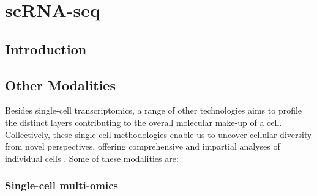 
\newpage

\section{scRNA-seq}  %
\label{sec:scrna} 

\subsection{Introduction}
\label{sec:141}


\subsection{Other Modalities}
\label{sec:142}

Besides single-cell transcriptomics, a range of other technologies aims to profile the distinct layers contributing to the overall molecular make-up of a cell. Collectively, these single-cell methodologies enable us to uncover cellular diversity from novel perspectives, offering comprehensive and impartial analyses of individual cells \textbf{\cite{stein_single-cell_2021}}. Some of these modalities are:

\subsubsection{Single-cell multi-omics}

